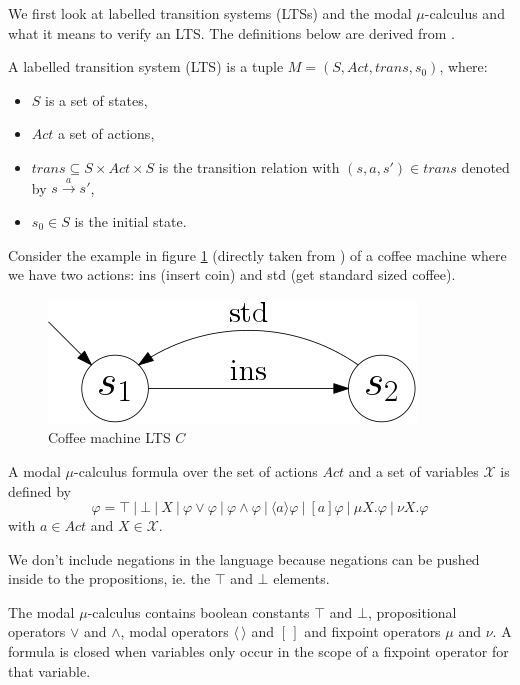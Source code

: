 We first look at labelled transition systems (LTSs) and the modal $\mu$-calculus and what it means to verify an LTS. The definitions below are derived from \cite{Groote}.
\begin{definition}
	\label{def_lts}A labelled transition system (LTS) is a tuple $M = (S, Act, trans, s_0)$, where:
	\begin{itemize}
		\item $S$ is a set of states,
		\item $Act$ a set of actions,
		\item $trans \subseteq S \times Act \times S$ is the transition relation with $(s,a,s') \in trans$ denoted by $s \xrightarrow a s'$,
		\item $s_0 \in S$ is the initial state.
	\end{itemize}
\end{definition}
Consider the example in figure \ref{fig:coffeemachinebasiceurolts} (directly taken from \cite{FamBasedModelCheckingWithMCRL2}) of a coffee machine where we have two actions: ins (insert coin) and std (get standard sized coffee).\\
\begin{figure}[h]
	\centering
	\includegraphics[scale=0.3]{Examples/CoffeeMachine/BasicEuroLTS}
	\caption[Coffee machine LTS]{Coffee machine LTS $C$}
	\label{fig:coffeemachinebasiceurolts}
\end{figure}


\begin{definition}
	\label{def_mu_syntax}
	A modal $\mu$-calculus formula over the set of actions $Act$ and a set of variables $\mathcal{X}$ is defined by
	\[ \varphi = \top\ |\ \bot\ |\ X\ |\ \varphi \vee \varphi\ |\ \varphi \wedge \varphi\ |\ \langle a \rangle \varphi\ |\ [a]\varphi\ |\ \mu X.\varphi\ |\ \nu X.\varphi \]
	with $a \in Act$ and $X \in \mathcal{X}$. 
	
	
	We don't include negations in the language because negations can be pushed inside to the propositions, ie. the $\top$ and $\bot$ elements.
\end{definition}
The modal $\mu$-calculus contains boolean constants $\top$ and $\bot$, propositional operators $\vee$ and $\wedge$, modal operators $\langle \, \rangle$ and $[ \, ]$ and fixpoint operators $\mu$ and $\nu$. A formula is closed when variables only occur in the scope of a fixpoint operator for that variable.

